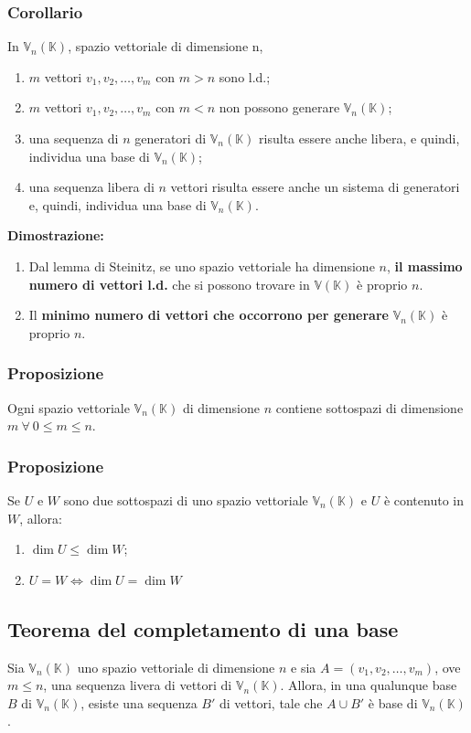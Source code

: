 \documentclass{article}
\newcommand{\V}{\mathbb{V} (\mathbb{K})}
\newcommand{\s}[2]{#1_1, #1_2, \ldots, #1_{#2}}
\newcommand{\Vx}[1]{\mathbb{V}_#1 (\mathbb{K})}
\begin{document}
\subsubsection{Corollario}
In $\Vx{n}$, spazio vettoriale di dimensione n,
\begin{enumerate}
    \item $m$ vettori $\s{v}{m}$ con $m > n$ sono l.d.;
    \item $m$ vettori $\s{v}{m}$ con $m < n$ non possono generare $\Vx{n}$;
    \item una sequenza di $n$ generatori di $\Vx{n}$ risulta essere anche libera, e
          quindi, individua una base di $\Vx{n}$;
    \item una sequenza libera di $n$ vettori risulta essere anche un sistema di generatori e, quindi, individua una base di $\Vx{n}$.
\end{enumerate}
\textbf{Dimostrazione:}
\begin{enumerate}
    \item Dal lemma di Steinitz, se uno spazio vettoriale ha dimensione $n$, \textbf{il
              massimo numero di vettori l.d.} che si possono trovare in $\V$ è proprio $n$.
    \item Il \textbf{minimo numero di vettori che occorrono per generare} $\Vx{n}$ è
          proprio $n$.
\end{enumerate}

\subsubsection{Proposizione}
Ogni spazio vettoriale $\Vx{n}$ di dimensione $n$ contiene sottospazi di
dimensione $m \ \forall \ 0\leq m\leq n$.

\subsubsection{Proposizione}
Se $U$ e $W$ sono due sottospazi di uno spazio vettoriale $\Vx{n}$ e $U$ è
contenuto in $W$, allora:
\begin{enumerate}
    \item $\dim U\leq\dim W$;
    \item $U = W \iff \dim U = \dim W$
\end{enumerate}

\subsection{Teorema del completamento di una base}
Sia $\Vx{n}$ uno spazio vettoriale di dimensione $n$ e sia $A = (\s{v}{m})$,
ove $m\leq n$, una sequenza livera di vettori di $\Vx{n}$. Allora, in una
qualunque base $B$ di $\Vx{n}$, esiste una sequenza $B'$ di vettori, tale che
$A\cup B'$ è base di $\Vx{n}$.
\end{document}
